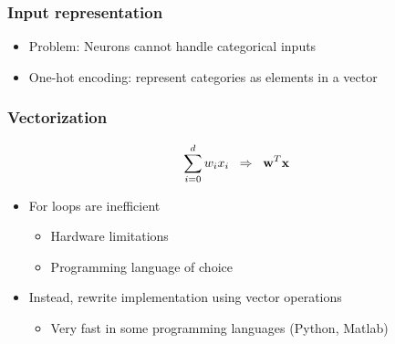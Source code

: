 \documentclass[10pt]{beamer}
\begin{document}
\begin{frame}
\frametitle{Input representation}
\begin{itemize}
\item {\color{red} Problem}: Neurons cannot handle categorical inputs
\item {\color{green} One-hot encoding}: represent categories as elements in a vector
\end{itemize}

\vspace*{1cm}

\begin{center}
\end{center}
\end{frame}

\begin{frame}
\frametitle{Vectorization}
\[\sum_{i=0}^d w_ix_i \;\; \Rightarrow \;\; {\bf w}^T{\bf x}\]
\begin{itemize}
\item For loops are {\color{red} inefficient}
\begin{itemize}
\item Hardware limitations
\item Programming language of choice
\end{itemize}
\item Instead, rewrite implementation using {\color{green} vector operations}
\begin{itemize}
\item Very fast in some programming languages (Python, Matlab)
\end{itemize}
\end{itemize}
\end{frame}
\end{document}
